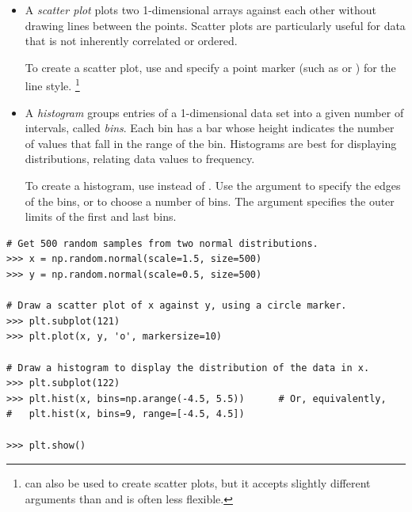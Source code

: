 \begin{itemize}
\item A \emph{scatter plot} plots two 1-dimensional arrays against each other without drawing lines between the points.
Scatter plots are particularly useful for data that is not inherently correlated or ordered.

To create a scatter plot, use  and specify a point marker (such as  or ) for the line style.%
\footnote{ can also be used to create scatter plots, but it accepts slightly different arguments than  and is often less flexible.}

\item A \emph{histogram} groups entries of a 1-dimensional data set into a given number of intervals, called \emph{bins}.
Each bin has a bar whose height indicates the number of values that fall in the range of the bin.
Histograms are best for displaying distributions, relating data values to frequency.

To create a histogram, use  instead of .
Use the argument  to specify the edges of the bins, or to choose a number of bins.
The  argument specifies the outer limits of the first and last bins.
\end{itemize}

\begin{lstlisting}
# Get 500 random samples from two normal distributions.
>>> x = np.random.normal(scale=1.5, size=500)
>>> y = np.random.normal(scale=0.5, size=500)

# Draw a scatter plot of x against y, using a circle marker.
>>> plt.subplot(121)
>>> plt.plot(x, y, 'o', markersize=10)

# Draw a histogram to display the distribution of the data in x.
>>> plt.subplot(122)
>>> plt.hist(x, bins=np.arange(-4.5, 5.5))      # Or, equivalently,
#   plt.hist(x, bins=9, range=[-4.5, 4.5])

>>> plt.show()
\end{lstlisting}

